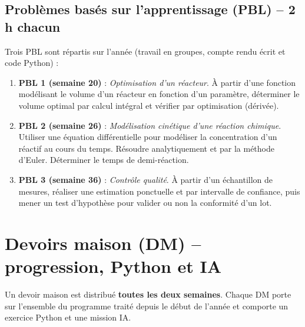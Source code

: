 \documentclass[a4paper,12pt]{article}
\begin{document}
\subsection{Problèmes basés sur l’apprentissage (PBL) – 2 h chacun}
Trois PBL sont répartis sur l’année (travail en groupes, compte rendu écrit et code Python) :

\begin{enumerate}
    \item \textbf{PBL 1 (semaine 20)} : \emph{Optimisation d’un réacteur}. À partir d’une fonction modélisant le volume d’un réacteur en fonction d’un paramètre, déterminer le volume optimal par calcul intégral et vérifier par optimisation (dérivée).
    \item \textbf{PBL 2 (semaine 26)} : \emph{Modélisation cinétique d’une réaction chimique}. Utiliser une équation différentielle pour modéliser la concentration d’un réactif au cours du temps. Résoudre analytiquement et par la méthode d’Euler. Déterminer le temps de demi-réaction.
    \item \textbf{PBL 3 (semaine 36)} : \emph{Contrôle qualité}. À partir d’un échantillon de mesures, réaliser une estimation ponctuelle et par intervalle de confiance, puis mener un test d’hypothèse pour valider ou non la conformité d’un lot.
\end{enumerate}

\section{Devoirs maison (DM) -- progression, Python et IA}

Un devoir maison est distribué \textbf{toutes les deux semaines}. Chaque DM porte sur l’ensemble du programme traité depuis le début de l’année et comporte un exercice Python et une mission IA.
\end{document}

